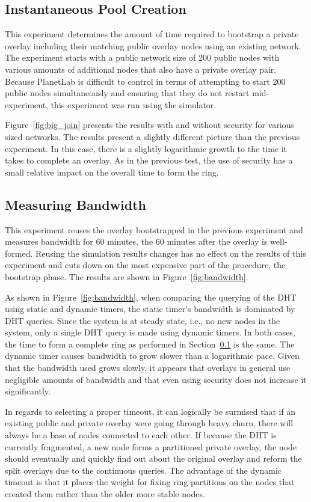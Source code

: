 \subsection{Instantaneous Pool Creation}
\label{mass_join}
This experiment determines the amount of time required to bootstrap a private
overlay including their matching public overlay nodes using an existing network.
The experiment starts with a public network size of 200 public nodes with
various amounts of additional nodes that also have a private overlay pair.
Because PlanetLab is difficult to control in terms of attempting to start 200
public nodes simultaneously and ensuring that they do not restart
mid-experiment, this experiment was run using the simulator.  

Figure~\ref{fig:big_join} presents the results with and without security for
various sized networks.  The results present a slightly different picture than
the previous experiment.  In this case, there is a slightly logarithmic growth
to the time it takes to complete an overlay.  As in the previous test, the use
of security has a small relative impact on the overall time to form the ring.

\subsection{Measuring Bandwidth}
This experiment reuses the overlay bootstrapped in the previous experiment and
measures bandwidth for 60 minutes, the 60 minutes after the overlay is
well-formed.  Reusing the simulation results changes has no effect on the
results of this experiment and cuts down on the most expensive part of the
procedure, the bootstrap phase.  The results are shown in
Figure~\ref{fig:bandwidth}.

As shown in Figure~\ref{fig:bandwidth}, when comparing the querying of the DHT
using static and dynamic timers, the static timer's bandwidth is dominated by
DHT queries.  Since the system is at steady state, i.e., no new nodes in the
system, only a single DHT query is made using dynamic timers.  In both cases,
the time to form a complete ring as performed in Section~\ref{mass_join} is the
same. The dynamic timer causes bandwidth to grow slower than a logarithmic pace.
Given that the bandwidth used grows slowly, it appears that overlays in general
use negligible amounts of bandwidth and that even using security does not
increase it significantly.

In regards to selecting a proper timeout, it can logically be surmised that
if an existing public and private overlay were going through heavy churn,
there will always be a base of nodes connected to each other.  If because the DHT
is currently fragmented, a new node forms a partitioned private overlay, the node
should eventually and quickly find out about the original overlay and reform
the split overlays due to the continuous queries.  The advantage of the dynamic
timeout is that it places the weight for fixing ring partitions
on the nodes that created them rather than the older more stable nodes. 

